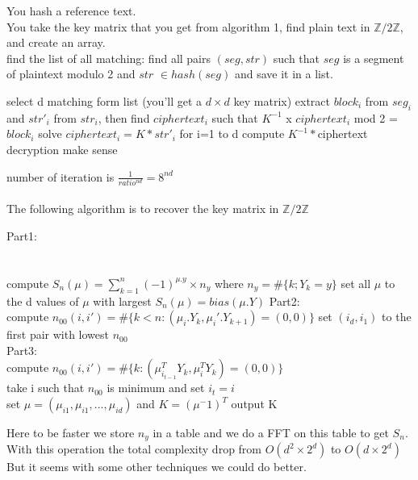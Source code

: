 \documentclass{article}
\begin{document}
You hash a reference text.\\
You take the key matrix that you get from algorithm 1, find plain text in $\mathbb{Z}/2\mathbb{Z}$, and create an array.\\
find the list of all matching: find all pairs $(seg,str)$ such that $seg$ is a segment of plaintext modulo 2 and $str$ $\in hash(seg)$ and save it in a list.\\
\begin{algorithmic}[1]
	\REPEAT
\STATE select d matching form list (you'll get a $d\times d$ key matrix)
	\STATE extract $block_{i}$ from $seg_{i}$ and $str'_{i}$ from $str_{i}$,
	\STATE then find $ciphertext_{i}$ such that $K^{-1}$ x $ciphertext_{i}$ mod 2 = $block_{i}$
\ENDFOR
\STATE solve $ciphertext_{i} = K * str'_{i}$ for i=1 to d
\STATE compute $K^{-1} * $ciphertext
\UNTIL decryption make sense
\end{algorithmic}
number of iteration is $ \frac{1}{ratio^{nd}} = 8^{nd}$
\\
\\
The following algorithm is to recover the key matrix in $\mathbb{Z}/2\mathbb{Z}$\\
\begin{algorithmic}[1]
\STATE Part1:\\
\\
\\
\FORALL{$\mu$}
	\STATE compute $S_n(\mu) = \sum_{k=1}^{n}{(-1)^{\mu.y} \times n_y}$ where $n_y=\#\{k;Y_k=y\}$
\ENDFOR
\STATE set all $\mu$ to the d values of $\mu$ with largest $S_n(\mu)=bias(\mu.Y)$
\STATE Part2:\\
	\STATE compute $n_{00}(i,i')=\#\{k<n:(\mu_i .Y_k,\mu_i'.Y_{k+1})=(0,0)\}$
\ENDFOR
\STATE set $(i_d,i_1)$ to the first pair with lowest $n_{00}$
\\
\STATE Part3:\\
		\STATE compute $n_{00}(i,i{'})=\#\{k:(\mu^{T}_{i_{t-1}}Y_{k},\mu^{T}_{i}Y_{k})=(0,0)\}$\\
	\ENDFOR
	\STATE take i such that $n_{00}$ is minimum and set $i_t=i$\\
\ENDFOR
\STATE set $\mu = (\mu_{i1},\mu_{i1},...,\mu_{id})$ and $K=(\mu^-1)^T$
\STATE output K
\end{algorithmic}
Here to be faster we store $n_y$ in a table and we do a FFT on this table to get $S_n$. With this operation the total complexity drop from $O(d^2 \times 2^d)$ to $O(d \times 2^d)$
But it seems with some other techniques we could do better.
\end{document}
